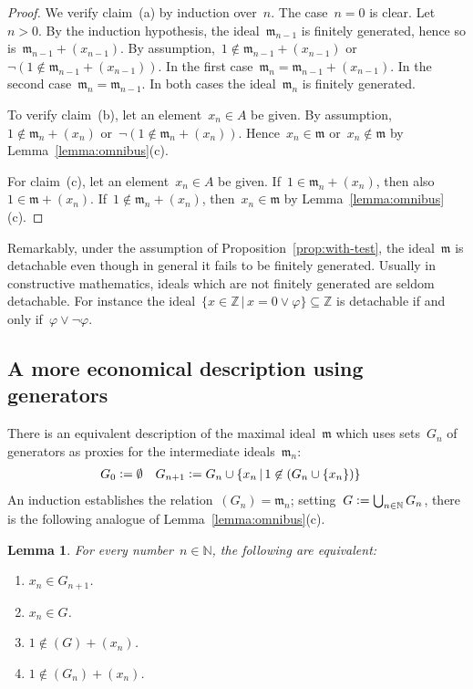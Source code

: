 \documentclass[com,11pt,crcready]{iosart2x}
\theoremstyle{definition}
\theoremstyle{plain}
\newtheorem{lemma}[definition]{Lemma}
\theoremstyle{remark}
\newcommand{\mmm}{\mathfrak{m}}
\newcommand{\NN}{\mathbb{N}}
\newcommand{\ZZ}{\mathbb{Z}}
\newcommand{\defeq}{\vcentcolon=}
\renewcommand{\_}{\mathpunct{.}\,}
\begin{document}
\begin{proof}We verify claim~(a) by induction over~$n$. The case~$n = 0$ is
clear. Let~$n > 0$. By the induction hypothesis, the ideal~$\mmm_{n-1}$ is finitely
generated, hence so is~$\mmm_{n-1} + (x_{n-1})$. By assumption,~$1 \not\in \mmm_{n-1} +
(x_{n-1})$ or~$\neg(1 \not\in \mmm_{n-1} + (x_{n-1}))$. In the first
case~$\mmm_n = \mmm_{n-1} + (x_{n-1})$. In the second case~$\mmm_n =
\mmm_{n-1}$. In both cases
the ideal~$\mmm_n$ is finitely generated.

To verify claim~(b), let an element~$x_n \in A$ be given. By assumption,~$1
\not\in \mmm_n + (x_n)$ or~$\neg(1 \not\in \mmm_n + (x_n))$. Hence~$x_n \in
\mmm$ or~$x_n \not\in \mmm$ by Lemma~\ref{lemma:omnibus}(c).

For claim~(c), let an element~$x_n \in A$ be given. If~$1 \in \mmm_n + (x_n)$,
then also~$1 \in \mmm + (x_n)$. If~$1 \not\in \mmm_n + (x_n)$, then~$x_n \in
\mmm$ by Lemma~\ref{lemma:omnibus}(c).
\end{proof}

Remarkably, under the assumption of Proposition~\ref{prop:with-test}, the ideal~$\mmm$ is detachable even though in
general it fails to be finitely generated. Usually in constructive mathematics, ideals which are not
finitely generated are seldom detachable. For instance the ideal~$\{ x \in
\ZZ \,|\, x = 0 \vee \varphi \} \subseteq \ZZ$ is detachable if and only
if~$\varphi \vee \neg\varphi$.


\subsection{A more economical description using generators}

There is an equivalent description of the
maximal ideal~$\mmm$ which uses sets~$G_n$ of generators as proxies for the
intermediate ideals~$\mmm_n$:
\begin{align*}
  G_0 &\defeq \emptyset &
  G_{n+1} &\defeq G_n \cup \{ x_n \,|\, 1 \not\in (G_n \cup \{ x_n \}) \}
\end{align*}
An induction establishes the relation~$(G_n) = \mmm_n$; setting~$G \defeq
\bigcup_{n\in\NN} G_n$, there is the following analogue of
Lemma~\ref{lemma:omnibus}(c).

\begin{lemma}\label{lemma:via-generators}For every number~$n \in \NN$, the following are equivalent:
\begin{enumerate}
\item[(1)] $x_n \in G_{n+1}$.
\item[(2)] $x_n \in G$.
\item[(3)] $1 \not\in (G) + (x_n)$.
\item[(4)] $1 \not\in (G_n) + (x_n)$.
\end{enumerate}
\end{lemma}
\end{document}
